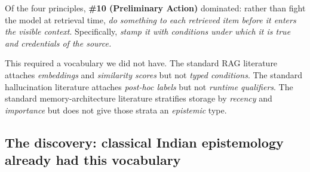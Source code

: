 Of the four principles, \textbf{\#10 (Preliminary Action)} dominated: rather than fight the model at retrieval time, \emph{do something to each retrieved item before it enters the visible context}. Specifically, \emph{stamp it with conditions under which it is true and credentials of the source.}

This required a vocabulary we did not have. The standard RAG literature attaches \emph{embeddings} and \emph{similarity scores} but not \emph{typed conditions}. The standard hallucination literature attaches \emph{post-hoc labels} but not \emph{runtime qualifiers}. The standard memory-architecture literature \citep{sumers2024coala, packer2023memgpt} stratifies storage by \emph{recency} and \emph{importance} but does not give those strata an \emph{epistemic} type.

\subsection{The discovery: classical Indian epistemology already had this vocabulary}\label{the-discovery-classical-indian-epistemology-already-had-this-vocabulary}

